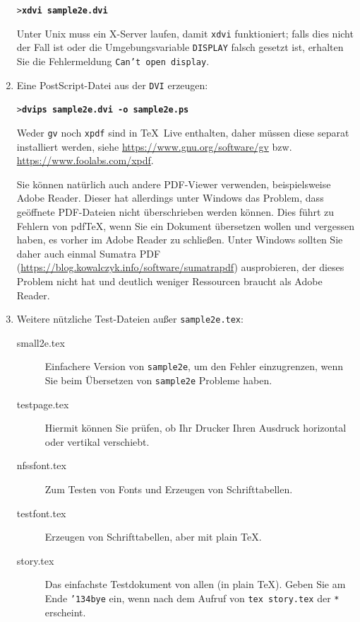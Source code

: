 \documentclass[12pt,ngerman,a4paper,fullparskip]{report}
\newcommand{\TL}{\TeX\ Live\xspace}
\newcommand{\acro}[1]{\texttt{#1}}
\newcommand{\cmdname}[1]{\texttt{#1}}
\newcommand{\code}[1]{\texttt{#1}}
\newcommand{\filename}[1]{\texttt{#1}}
\newcommand{\envname}[1]{\texttt{#1}}
\newcommand{\samp}[1]{\texttt{#1}}
\newcommand{\Ucom}[1]{\textbf{\texttt{#1}}}
\newcommand{\bs}{\protect\normalfont\ttfamily\char'134}
\providecommand*{\PS}{Post\-Script\xspace}
\providecommand*{\dvi}{\acro{DVI}\xspace}
\begin{document}
\begin{enumerate}
\begin{alltt}
> \Ucom{xdvi sample2e.dvi}    
\end{alltt}

Unter Unix muss ein X-Server laufen, damit \cmdname{xdvi} funktioniert; falls dies nicht der Fall ist oder die Umgebungsvariable \envname{DISPLAY} falsch gesetzt ist, erhalten Sie die Fehlermeldung \samp{Can't open display}.

\item Eine \PS{}-Datei aus der \dvi erzeugen:
\begin{alltt}
> \Ucom{dvips sample2e.dvi -o sample2e.ps}
\end{alltt}

Weder \cmdname{gv} noch \cmdname{xpdf} sind in \TL{} enthalten, daher müssen diese separat installiert
werden, siehe \url{https://www.gnu.org/software/gv} bzw. \url{https://www.foolabs.com/xpdf}.

Sie können natürlich auch andere PDF-Viewer verwenden, beispielsweise Adobe Reader. Dieser hat allerdings unter Windows das Problem, dass geöffnete PDF-Dateien nicht überschrieben werden können. Dies führt zu Fehlern von pdf\TeX, wenn Sie ein Dokument übersetzen wollen und vergessen haben, es vorher im Adobe Reader zu schließen. Unter Windows sollten Sie daher auch einmal Sumatra PDF (\url{https://blog.kowalczyk.info/software/sumatrapdf}) ausprobieren, der dieses Problem nicht hat und deutlich weniger Ressourcen braucht als Adobe Reader.

\item Weitere nützliche Test-Dateien außer
\filename{sample2e.tex}:

\begin{description}
\item [small2e.tex] Einfachere Version von \filename{sample2e}, um den Fehler einzugrenzen, wenn Sie
beim Übersetzen von \filename{sample2e} Probleme haben.
\item [testpage.tex] Hiermit können Sie prüfen, ob Ihr Drucker Ihren Ausdruck horizontal oder vertikal verschiebt.
\item [nfssfont.tex] Zum Testen von Fonts und Erzeugen von Schrifttabellen.
\item [testfont.tex] Erzeugen von Schrifttabellen, aber mit plain \TeX.
\item [story.tex] Das einfachste Testdokument von allen (in plain \TeX{}).
Geben Sie am Ende \samp{\bs bye} ein, wenn nach dem Aufruf von \samp{tex
story.tex} der \code{*} erscheint.
\end{description}


\end{enumerate}
\end{document}
